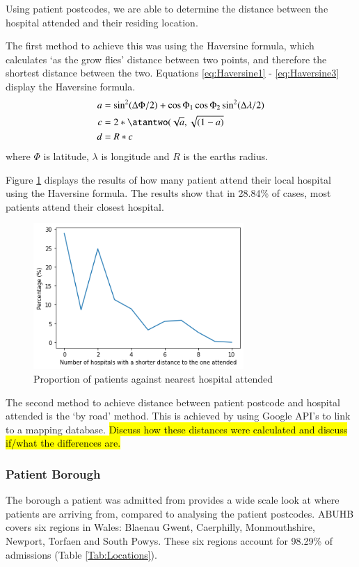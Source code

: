 \documentclass[../thesis.tex]{subfiles}
\begin{document}
Using patient postcodes, we are able to determine the distance between the hospital attended and their residing location.

The first method to achieve this was using the Haversine formula, which calculates `as the grow flies' distance between two points, and therefore the shortest distance between the two.
Equations \ref{eq:Haversine1} - \ref{eq:Haversine3} display the Haversine formula.
\begin{align}\label{eq:Haversine1}
    a&= \sin^{2}(\Delta\Phi/2) +\cos\Phi_{1}\cos\Phi_{2}\sin^{2}(\Delta\lambda/2)\\
    c &= 2* \atantwo(\sqrt{a},\sqrt{(1-a)}\label{eq:Haversine2}\\
    d &= R * c\label{eq:Haversine3}
\end{align}
where $\Phi$ is latitude, $\lambda$ is longitude and $R$ is the earths radius.%

Figure \ref{fig:distance} displays the results of how many patient attend their local hospital using the Haversine formula. The results show that in 28.84\% of cases, most patients attend their closest hospital.
\begin{figure}[h!]
    \centering
    \includegraphics[width = 8cm]{Chapters/Chapter3/Figures/DistanceHospital.png}
    \caption{Proportion of patients against nearest hospital attended}
    \label{fig:distance}
\end{figure}

The second method to achieve distance between patient postcode and hospital attended is the `by road' method. This is achieved by using Google API's to link to a mapping database. 
\hl{Discuss how these distances were calculated and discuss if/what the differences are.}

\subsubsection{Patient Borough}
The borough a patient was admitted from provides a wide scale look at where patients are arriving from, compared to analysing the patient postcodes. ABUHB covers six regions in Wales: Blaenau Gwent, Caerphilly, Monmouthshire, Newport, Torfaen and South Powys. These six regions account for 98.29\% of admissions (Table \ref{Tab:Locations}).
\end{document}
